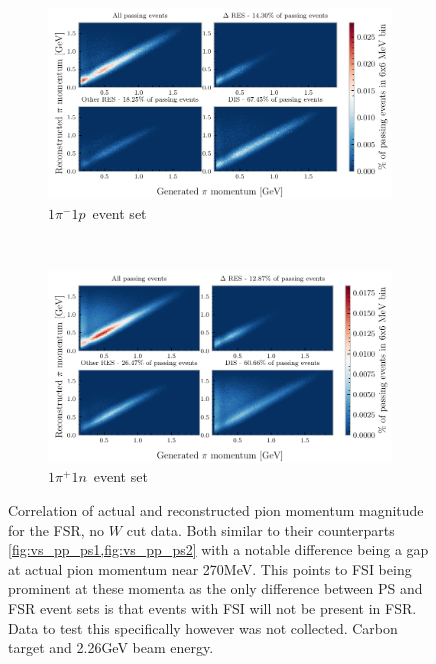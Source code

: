 \documentclass[a4paper,12pt]{article}
\newcommand{\md}{$1\pi^-1p$}
\newcommand{\pd}{$1\pi^+1n$}
\begin{document}
\begin{appendices}
    \begin{figure}[H]
        \centering
        \begin{subfigure}{\textwidth}
            \centering
            \includegraphics{figures/python/vs_pp_C_m_fsr.pdf}
            \caption{\md\ event set}
        \end{subfigure}
        \\
        \begin{subfigure}{\textwidth}
            \centering
            \includegraphics{figures/python/vs_pp_C_p_fsr.pdf}
            \caption{\pd\ event set}
        \end{subfigure}{\textwidth}
        \caption{
            Correlation of actual and reconstructed pion momentum magnitude for the FSR, no $W$ cut data.
            Both similar to their counterparts \cref{fig:vs_pp_ps1,fig:vs_pp_ps2} with a notable difference being a gap at actual pion momentum near 270\si{MeV}.
            This points to FSI being prominent at these momenta as the only difference between PS and FSR event sets is that events with FSI will not be present in FSR.
            Data to test this specifically however was not collected.
            Carbon target and 2.26\si{GeV} beam energy.
        }\label{fig:vs_pp_fsr}
    \end{figure}


\end{appendices}
\end{document}
